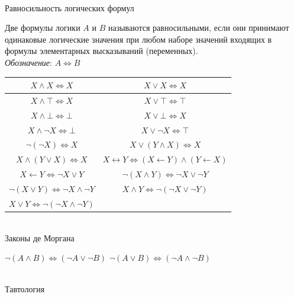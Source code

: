 \begin{frame}{\\Равносильность логических формул}
	\topline
	\\
	\footnotesize{
		Две формулы логики $A$ и $B$ называются равносильными, если они принимают одинаковые логические значения при любом наборе значений входящих в формулы элементарных высказываний (переменных).\\
		\textit{Обозначение}: $A \iff B$
		\begin{center}
			\begin{tabular}{|c|c|}
				\hline
				$X \land X \iff X$ & $X \lor X \iff X$\\
				\hline
				$X \land \top \iff X$ & $X \lor \top \iff \top$\\
				\hline
				$X \land \bot \iff \bot$ & $X \lor \bot \iff X$\\
				\hline
				$X \land \neg X \iff \bot$ & $X \lor \neg X \iff \top$\\
				\hline
				$\neg(\neg X) \iff X$ & $X \lor (Y \land X) \iff X$\\
				\hline
				$X \land (Y \lor X) \iff X$ & $X \leftrightarrow Y \iff (X \leftarrow Y) \land (Y \leftarrow X)$\\
				\hline
				$X \leftarrow Y \iff \neg X \lor Y$ & $\neg(X \land Y) \iff \neg X \lor \neg Y$\\
				\hline
				$\neg(X \lor Y) \iff \neg X \land \neg Y$ & $X \land Y \iff \neg(\neg X \lor \neg Y)$\\
				\hline
				$X \lor Y \iff \neg(\neg X \land \neg Y)$ &\\
				\hline
			\end{tabular}
		\end{center}
	}
\end{frame}

\begin{frame}{\\Законы де Моргана}
	\topline
	\justifying
	\Huge
	\begin{center}
		$\neg(A \land B) \iff (\neg A \lor \neg B) $
		$\neg(A \lor B) \iff (\neg A \land \neg B) $
	\end{center}
\end{frame}

\begin{frame}{\\Тавтология}
	\topline
	\justifying
	\begin{SCn}
	\end{SCn}
\end{frame}

